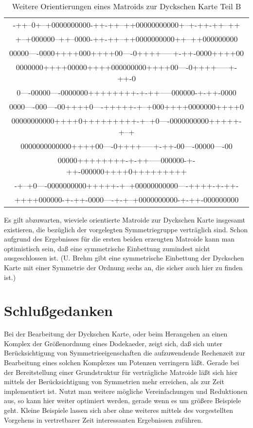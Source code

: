 \begin{table}
{\begin{center}
\begin{tabular}{c}
-++--0+--+0000000000-++-++--++00000000000+--+-++-++--++\\
+--+000000--++--0000-++-++--++0000000000++--++000000000\\[2mm]
00000----0000++++000++++00----0++++-----+-++-0000++++00\\
0000000++++00000++++000000000++++00----0++++-----+-++-0\\
0----00000----0000000++++++++-+-++-----000000-+-++-0000\\
0000----000----00++++0----+++++-+--+000++++0000000++++0\\
00000000000++++0+++++++++-+--+0----0000000000+++++-+--+\\
0000000000000++++00----0++++-----+-++-00----00000----00\\
00000++++++++-+-++-----000000-+-++-000000++++0+++++++++\\
-+--+0----0000000000+++++-+--+00000000000----++++-+-++-\\
++++000000-+-++-0000----+-+--+0000000000-+-++-000000000
\end{tabular}
\end{center}
}
\caption{\label{dyckori2B}Weitere Orientierungen eines Matroids zur Dyckschen
         Karte Teil B}
\end{table}

Es gilt abzuwarten, wieviele orientierte Matroide zur Dyckschen Karte
insgesamt existieren, die bezüglich der vorgelegten Symmetriegruppe
verträglich sind. Schon aufgrund des Ergebnisses für die ersten beiden
erzeugten Matroide kann man optimistisch sein, daß eine symmetrische
Einbettung zumindest nicht ausgeschlossen ist. (U. Brehm gibt eine symmetrische
Einbettung der Dyckschen Karte mit einer Symmetrie der Ordnung sechs an, die
sicher auch hier zu finden ist.)

\clearpage
\section{Schlußgedanken}

Bei der Bearbeitung der Dyckschen Karte, oder beim Herangehen an einen
Komplex der Größenordnung eines Dodekaeder, zeigt sich, daß sich unter
Berücksichtigung von Symmetrieeigenschaften die aufzuwendende Rechenzeit
zur Bearbeitung eines solchen Komplexes um Potenzen verringern läßt.
Gerade bei der Bereitstellung einer Grundstruktur für verträgliche Matroide
läßt sich hier mittels der Berücksichtigung von Symmetrien mehr erreichen,
als zur Zeit implementiert ist. Nutzt man weitere mögliche Vereinfachungen und
Reduktionen aus, so kann hier weiter optimiert werden, gerade wenn es um
größere Beispiele geht.
Kleine Beispiele lassen sich aber ohne weiteres mittels des vorgestellten
Vorgehens in vertretbarer Zeit interessanten Ergebnissen zuführen.

